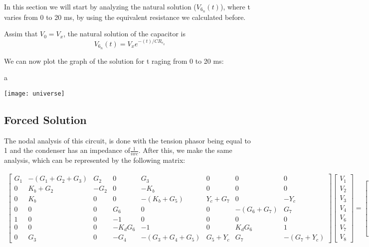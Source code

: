 In this section we will start by analyzing the natural solution ($V_6_n(t)$), where t varies from 0 to 20 ms, by using the equivalent resistance we calculated before.

Assim that $V_0 = V_x$, the natural solution of the capacitor is  
\begin{equation}
	V_6_n(t) = V_xe^{-(t)/CR_e_q}
\end{equation}

We can now plot the graph of the solution for t raging from 0 to 20 ms:
\usepackage{graphicx}
\graphicspath{ {./images/} }

	a
	
	\texttt{[image: universe]}
	
\subsection{Forced Solution}

The nodal analysis of this circuit, is done with the tension phasor being equal to 1 and the condenser has an impedance of$\frac{1}{iwc}$.
After this, we make the same analysis, which can be represented by the following matrix:
\usepackage{amsmath}
\begin{gather}
	\begin{bmatrix}
		G_1 & -(G_1 + G_2 + G_3) & G_2 & 0 & G_3 & 0 & 0 & 0 \\ 
		0 & K_b + G_2 & -G_2 & 0 & -K_b & 0 & 0 & 0 \\
		0 & K_b & 0 & 0 & -(K_b + G_5) & Y_c + G_7 & 0 & -Y_c \\ 
		0 & 0 & 0 & G_6 & 0 & 0 & -(G_6 + G_7) & G_7 \\
		1 & 0 & 0 & -1 & 0 & 0 & 0 & 0 \\
		0 & 0 & 0 & -K_dG_6 & -1 & 0 & K_dG_6 & 1 \\
		0 & G_3 & 0 & -G_4 & -(G_3 + G_4 + G_5) & G_5 + Y_c & G_7 & -(G_7 + Y_c)
	\end{bmatrix}
	\begin{bmatrix} V_1 \\ V_2 \\ V_3 \\ V_4 \\ V_6 \\ V_7 \\ V_8 \end{bmatrix}
	=
	\begin{bmatrix} 0 \\ 0 \\ 0 \\ 0 \\ 1 \\ 0 \\ 0 \end{bmatrix}
	
\end{gather}

